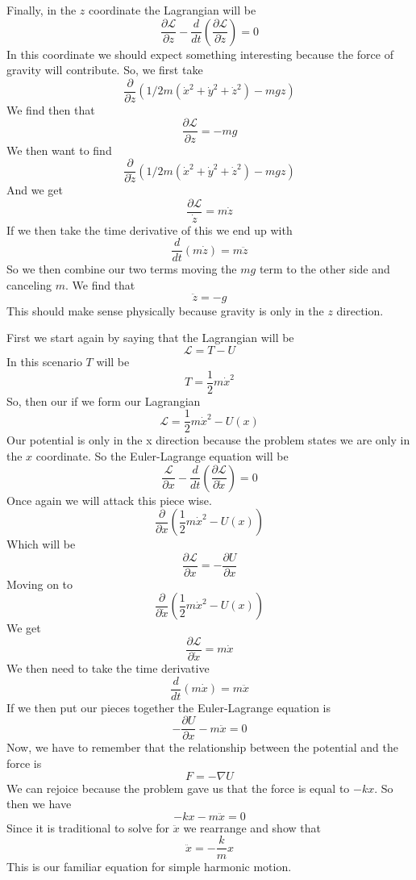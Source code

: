 \documentclass[11pt, leqno]{article}
\begin{document}
\bigskip

\noindent Finally, in the $z$ coordinate the Lagrangian will be 
$$
\frac{\partial \mathcal{L}}{\partial z} - \frac{d}{dt}\left(\frac{\partial\mathcal{L}}{\partial \dot{z}}\right) = 0
$$
In this coordinate we should expect something interesting because the force of gravity will contribute. So, we first take 
$$
\frac{\partial}{\partial z}\left(1/2 m(\dot{x}^2 + \dot{y}^2 + \dot{z}^2) - mgz \right)
$$
We find then that 
$$
\frac{\partial \mathcal{L}}{\partial z} = -mg
$$
We then want to find 
$$
\frac{\partial}{\partial \dot{z}}\left(1/2 m(\dot{x}^2 + \dot{y}^2 + \dot{z}^2) - mgz \right)
$$
And we get 
$$
\frac{\partial \mathcal{L}}{\dot{z}} = m\dot{z}
$$
If we then take the time derivative of this we end up with 
$$
\frac{d}{dt}\left( m\dot{z}\right) = m\ddot{z}
$$
So we then combine our two terms moving the $mg$ term to the other side and canceling $m$. We find that 
$$
\ddot{z} = -g 
$$
This should make sense physically because gravity is only in the $z$ direction. 

\bigskip



\noindent {}
First we start again by saying that the Lagrangian will be 
$$
\mathcal{L} = T - U 
$$
In this scenario $T$ will be 
$$
T = \frac{1}{2} m \dot{x}^2
$$
So, then our if we form our Lagrangian 
$$
\mathcal{L} = \frac{1}{2} m \dot{x}^2 - U(x) 
$$
Our potential is only in the x direction because the problem states we are only in the $x$ coordinate. 
So the Euler-Lagrange equation will be 
$$
\frac{\mathcal{L}}{\partial x} - \frac{d}{dt}\left( \frac{\partial \mathcal{L}}{\partial \dot{x}} \right) = 0
$$
Once again we will attack this piece wise. 
$$
\frac{\partial}{\partial x} \left( \frac{1}{2} m \dot{x}^2 - U(x)  \right)
$$
Which will be 
$$
\frac{\partial \mathcal{L}}{\partial x} = -\frac{\partial U}{\partial x}
$$
Moving on to 
$$
\frac{\partial}{\partial \dot{x}} \left( \frac{1}{2} m \dot{x}^2 - U(x)  \right)
$$
We get 
$$
\frac{\partial \mathcal{L}}{\partial \dot{x}} = m \dot{x}
$$
We then need to take the time derivative 
$$ 
\frac{d}{dt}\left( m \dot{x} \right) = m\ddot{x}
$$
If we then put our pieces together the Euler-Lagrange equation is 
$$
-\frac{\partial U}{\partial x} - m \ddot{x} = 0
$$
Now, we have to remember that the relationship between the potential and the force is 
$$
F = - \nabla U
$$
We can rejoice because the problem gave us that the force is equal to $-kx$. So then we have 
$$
-kx - m\ddot{x} = 0 
$$
Since it is traditional to solve for $\ddot{x}$ we rearrange and show that 
$$
\ddot{x} = - \frac{k}{m}x 
$$ 
This is our familiar equation for simple harmonic motion. 
\end{document}
